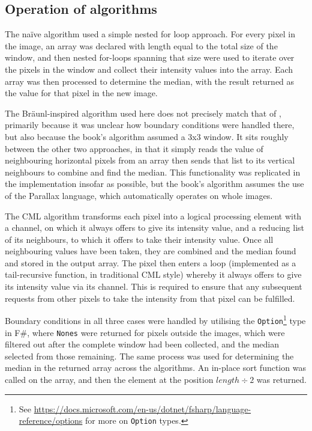 \subsection{Operation of algorithms}
The na\"{i}ve algorithm used a simple nested for loop approach.  For every pixel in the image, an array was declared with length equal to the total size of the window, and then nested for-loops spanning that size were used to iterate over the pixels in the window and collect their intensity values into the array.  Each array was then processed to determine the median, with the result returned as the value for that pixel in the new image.

The Bräunl-inspired algorithm used here does not precisely match that of \cite{Braunl2001}, primarily because it was unclear how boundary conditions were handled there, but also because the book's algorithm assumed a 3x3 window.  It sits roughly between the other two approaches, in that it simply reads the value of neighbouring horizontal pixels from an array then sends that list to its vertical neighbours to combine and find the median.  This functionality was replicated in the implementation insofar as possible, but the book's algorithm assumes the use of the Parallax language, which automatically operates on whole images.

The CML algorithm transforms each pixel into a logical processing element with a channel, on which it always offers to give its intensity value, and a reducing list of its neighbours, to which it offers to take their intensity value.  Once all neighbouring values have been taken, they are combined and the median found and stored in the output array.  The pixel then enters a loop (implemented as a tail-recursive function, in traditional CML style) whereby it always offers to give its intensity value via its channel.  This is required to ensure that any subsequent requests from other pixels to take the intensity from that pixel can be fulfilled.

Boundary conditions in all three cases were handled by utilising the \texttt{Option}\footnote{See \url{https://docs.microsoft.com/en-us/dotnet/fsharp/language-reference/options} for more on \texttt{Option} types.} type in F\#, where \texttt{Nones} were returned for pixels outside the images, which were filtered out after the complete window had been collected, and the median selected from those remaining.  The same process was used for determining the median in the returned array across the algorithms.  An in-place sort function was called on the array, and then the element at the position $length \div 2$ was returned.

